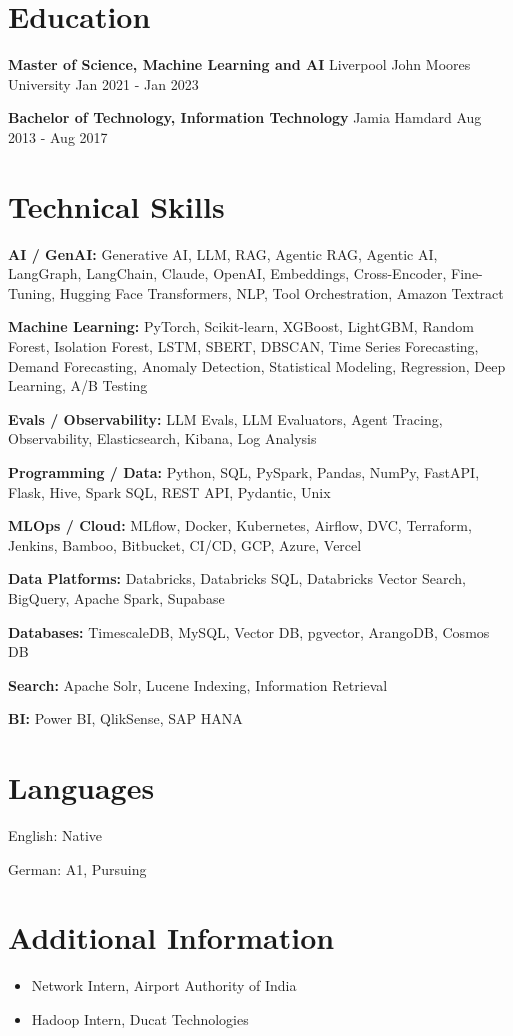 \documentclass[10pt,a4paper]{article}
\begin{document}
\section{Education}
\textbf{Master of Science, Machine Learning and AI} \textbar{} Liverpool John Moores University \hfill Jan 2021 - Jan 2023\par
\textbf{Bachelor of Technology, Information Technology} \textbar{} Jamia Hamdard \hfill Aug 2013 - Aug 2017\par

\section{Technical Skills}
\textbf{AI / GenAI:} Generative AI, LLM, RAG, Agentic RAG, Agentic AI, LangGraph, LangChain, Claude, OpenAI, Embeddings, Cross-Encoder, Fine-Tuning, Hugging Face Transformers, NLP, Tool Orchestration, Amazon Textract\par
\textbf{Machine Learning:} PyTorch, Scikit-learn, XGBoost, LightGBM, Random Forest, Isolation Forest, LSTM, SBERT, DBSCAN, Time Series Forecasting, Demand Forecasting, Anomaly Detection, Statistical Modeling, Regression, Deep Learning, A/B Testing\par
\textbf{Evals / Observability:} LLM Evals, LLM Evaluators, Agent Tracing, Observability, Elasticsearch, Kibana, Log Analysis\par
\textbf{Programming / Data:} Python, SQL, PySpark, Pandas, NumPy, FastAPI, Flask, Hive, Spark SQL, REST API, Pydantic, Unix\par
\textbf{MLOps / Cloud:} MLflow, Docker, Kubernetes, Airflow, DVC, Terraform, Jenkins, Bamboo, Bitbucket, CI/CD, GCP, Azure, Vercel\par
\textbf{Data Platforms:} Databricks, Databricks SQL, Databricks Vector Search, BigQuery, Apache Spark, Supabase\par
\textbf{Databases:} TimescaleDB, MySQL, Vector DB, pgvector, ArangoDB, Cosmos DB\par
\textbf{Search:} Apache Solr, Lucene Indexing, Information Retrieval\par
\textbf{BI:} Power BI, QlikSense, SAP HANA\par

\section{Languages}
English: Native\par
German: A1, Pursuing\par

\section{Additional Information}
\begin{itemize}
  \item Network Intern, Airport Authority of India
  \item Hadoop Intern, Ducat Technologies
\end{itemize}
\end{document}
